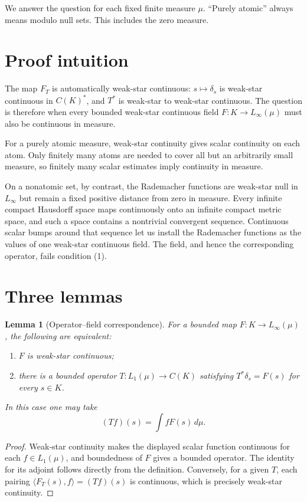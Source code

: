 \documentclass[11pt]{article}
\newtheorem{lemma}{Lemma}
\newcommand{\Linfty}{L_\infty(\mu)}
\newcommand{\Lone}{L_1(\mu)}
\begin{document}
We answer the question for each fixed finite measure $\mu$.  ``Purely
atomic'' always means modulo null sets.  This includes the zero measure.

\section{Proof intuition}

The map $F_T$ is automatically weak-star continuous: $s\mapsto\delta_s$ is
weak-star continuous in $C(K)^*$, and $T^*$ is weak-star to weak-star
continuous.  The question is therefore when every bounded weak-star
continuous field $F:K\to\Linfty$ must also be continuous in measure.

For a purely atomic measure, weak-star continuity gives scalar continuity on
each atom.  Only finitely many atoms are needed to cover all but an
arbitrarily small measure, so finitely many scalar estimates imply
continuity in measure.

On a nonatomic set, by contrast, the Rademacher functions are weak-star null
in $L_\infty$ but remain a fixed positive distance from zero in measure.
Every infinite compact Hausdorff space maps continuously onto an infinite
compact metric space, and such a space contains a nontrivial convergent
sequence.  Continuous scalar bumps around that sequence let us install the
Rademacher functions as the values of one weak-star continuous field.  The
field, and hence the corresponding operator, fails condition (1).

\section{Three lemmas}

\begin{lemma}[Operator--field correspondence]\label{lem:field}
For a bounded map $F:K\to\Linfty$, the following are equivalent:
\begin{enumerate}
\item $F$ is weak-star continuous;
\item there is a bounded operator $T:\Lone\to C(K)$ satisfying
      $T^*\delta_s=F(s)$ for every $s\in K$.
\end{enumerate}
In this case one may take
\[
 (Tf)(s)=\int fF(s)\,d\mu.
\]
\end{lemma}

\begin{proof}
Weak-star continuity makes the displayed scalar function continuous for
each $f\in\Lone$, and boundedness of $F$ gives a bounded operator.  The
identity for its adjoint follows directly from the definition.  Conversely,
for a given $T$, each pairing
$\langle F_T(s),f\rangle=(Tf)(s)$ is continuous, which is precisely
weak-star continuity.
\end{proof}
\end{document}
